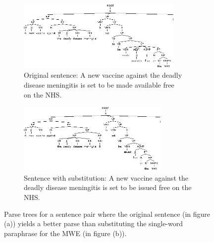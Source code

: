 \documentclass[11pt]{article}
\begin{document}
\begin{itemize}
\begin{figure}
\centering
\begin{subfigure}{.5\textwidth}
  \centering
  \includegraphics[width=80mm]{figs/made_available_tree.png}
  \caption{Original sentence: A new vaccine against the deadly \\
disease meningitis is set to be made available free \\
on the NHS.}
  \label{fig:sub1}
\end{subfigure}%
\begin{subfigure}{.5\textwidth}
  \centering
  \includegraphics[width=73mm]{figs/issued_tree.png}
  \caption{Sentence with substitution: A new vaccine against the deadly disease meningitis is set to be issued free on the NHS.}
  \label{fig:sub2}
\end{subfigure}
\caption{Parse trees for a sentence pair where the original sentence (in figure (a)) yields a better parse than substituting the single-word paraphrase for the MWE (in figure (b)).}
\label{issued}
\end{figure}



\end{itemize}
\end{document}
